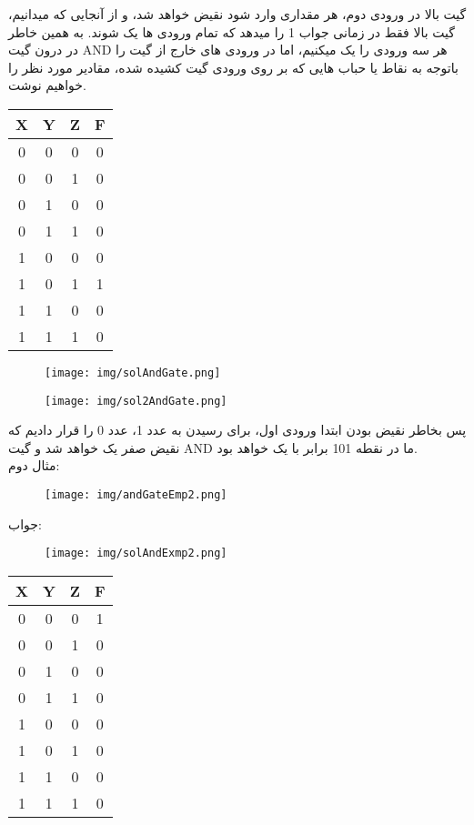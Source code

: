 \documentclass[pt, a5paper]{article}
\begin{document}
\raggedleft
\justifying
\newpage
گیت بالا در ورودی دوم، هر مقداری وارد شود نقیض خواهد شد، و از آنجایی که میدانیم، گیت بالا فقط در زمانی جواب 1 را میدهد که تمام ورودی ها یک شوند. به همین خاطر در درون گیت AND هر سه ورودی را یک میکنیم، اما در ورودی های خارج از گیت را باتوجه به نقاط یا حباب هایی که بر روی ورودی گیت کشیده شده، مقادیر مورد نظر را خواهیم نوشت.
\center
\begin{LTR}
	\begin{tabular}{ c c c | c }
		X & Y & Z & F \\
		\hline
		0 & 0 & 0 &  0\\ 				
		0 & 0 & 1 &  0\\
		0 & 1 & 0 &  0\\
		0 & 1 & 1 &  0\\
		1 & 0 & 0 &  0\\
		1 & 0 & 1 &  1\\
		1 & 1 & 0 &  0\\
		1 & 1 & 1 &  0\\	
	\end{tabular}
\end{LTR}
\hfill \break

\begin{figure}[htbp]
	\centerline{\texttt{[image: img/solAndGate.png]}}
\end{figure}

\begin{figure}[htbp]
	\centerline{\texttt{[image: img/sol2AndGate.png]}}
\end{figure}

\raggedleft
\justifying
پس بخاطر نقیض بودن ابتدا ورودی اول، برای رسیدن به عدد 1، عدد 0 را قرار دادیم که نقیض صفر یک خواهد شد و گیت AND ما در نقطه 101 برابر با یک خواهد بود.\\

مثال دوم:\\

\begin{figure}[htbp]
	\centerline{\texttt{[image: img/andGateEmp2.png]}}
\end{figure}

\raggedleft
\justifying
جواب:\\

\begin{figure}[htbp]
	\centerline{\texttt{[image: img/solAndExmp2.png]}}
\end{figure}

\center
\begin{LTR}
	\begin{tabular}{ c c c | c }
		X & Y & Z & F \\
		\hline
		0 & 0 & 0 &  1\\ 				
		0 & 0 & 1 &  0\\
		0 & 1 & 0 &  0\\
		0 & 1 & 1 &  0\\
		1 & 0 & 0 &  0\\
		1 & 0 & 1 &  0\\
		1 & 1 & 0 &  0\\
		1 & 1 & 1 &  0\\	
	\end{tabular}
\end{LTR}
\hfill \break
\end{document}
